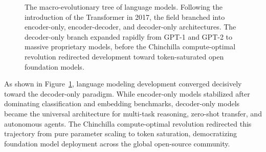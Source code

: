 \documentclass[../../main.tex]{subfiles}
\begin{document}
\begin{figure}[t]
\caption{The macro-evolutionary tree of language models. Following the introduction of the Transformer in 2017, the field branched into encoder-only, encoder-decoder, and decoder-only architectures. The decoder-only branch expanded rapidly from GPT-1 and GPT-2 to massive proprietary models, before the Chinchilla compute-optimal revolution redirected development toward token-saturated open foundation models.}
\label{fig:evolutionary_tree}
\end{figure}

As shown in Figure~\ref{fig:evolutionary_tree}, language modeling development converged decisively toward the decoder-only paradigm. While encoder-only models stabilized after dominating classification and embedding benchmarks, decoder-only models became the universal architecture for multi-task reasoning, zero-shot transfer, and autonomous agents. The Chinchilla compute-optimal revolution redirected this trajectory from pure parameter scaling to token saturation, democratizing foundation model deployment across the global open-source community.
\end{document}
